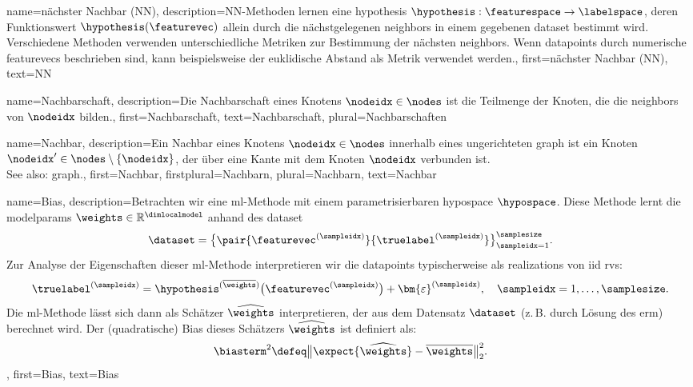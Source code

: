 {{
{
	name={nächster Nachbar (NN)},
	description={NN-Methoden lernen eine \gls{hypothesis} 
		$\hypothesis: \featurespace \rightarrow \labelspace$, deren Funktionswert $\hypothesis(\featurevec)$ 
		allein durch die nächstgelegenen \gls{neighbors} in einem gegebenen \gls{dataset} bestimmt wird. 
		Verschiedene Methoden verwenden unterschiedliche Metriken zur Bestimmung der nächsten 
		\gls{neighbors}. Wenn \gls{datapoint}s durch numerische \gls{featurevec}s beschrieben sind, 
		kann beispielsweise der euklidische Abstand als Metrik verwendet werden.},
	first={nächster Nachbar (NN)}, text={NN}
}

{
	name={Nachbarschaft},
	description={Die  Nachbarschaft eines Knotens $\nodeidx \in \nodes$ 
		ist die Teilmenge der Knoten, die die \gls{neighbors} von $\nodeidx$ bilden.},
	first={Nachbarschaft}, text={Nachbarschaft}, plural={Nachbarschaften}
}

{name={Nachbar},
description={Ein Nachbar eines Knotens $\nodeidx \in \nodes$ 
	innerhalb eines ungerichteten \gls{graph} ist ein Knoten $\nodeidx' \in \nodes \setminus \{ \nodeidx\}$, 
	der über eine Kante mit dem Knoten $\nodeidx$ verbunden ist.
			\\ 
	See also: \gls{graph}.},
first={Nachbar},
firstplural={Nachbarn}, 
plural={Nachbarn}, 
text={Nachbar} 
}


{
	name={Bias},
	description={Betrachten wir eine  \gls{ml}-Methode mit einem parametrisierbaren \gls{hypospace} $\hypospace$. 
		Diese Methode lernt die \glspl{modelparam} $\weights \in \mathbb{R}^{\dimlocalmodel}$ anhand des \gls{dataset}
		\[
		\dataset = \big\{ \pair{\featurevec^{(\sampleidx)}}{\truelabel^{(\sampleidx)}} \big\}_{\sampleidx=1}^{\samplesize}.
		\]
		Zur Analyse der Eigenschaften dieser \gls{ml}-Methode interpretieren wir die \gls{datapoint}s typischerweise 
		als \gls{realization}s von \gls{iid} \gls{rv}s:
		\[
		\truelabel^{(\sampleidx)} = \hypothesis^{(\overline{\weights})}\big( \featurevec^{(\sampleidx)} \big) + \bm{\varepsilon}^{(\sampleidx)}, 
		\quad \sampleidx=1,\ldots,\samplesize.
		\]
		Die \gls{ml}-Methode lässt sich dann als Schätzer $\widehat{\weights}$ interpretieren, der aus dem Datensatz $\dataset$ 
		(z.\,B. durch Lösung des \gls{erm}) berechnet wird. Der (quadratische) Bias dieses Schätzers $\widehat{\weights}$ ist definiert als:
		\[
		\biasterm^{2} \defeq \big\| \expect \{ \widehat{\weights} \} - \overline{\weights} \big\|_{2}^{2}.
		\]},
	first={Bias}, text={Bias}
}


}}
